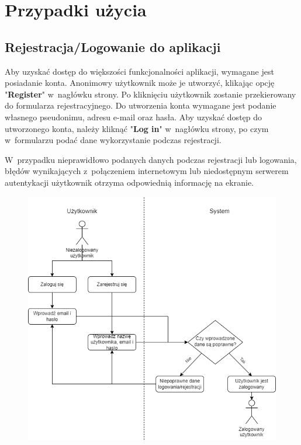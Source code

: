 \FloatBarrier

\section{Przypadki użycia}

\subsection{Rejestracja/Logowanie do aplikacji}

Aby uzyskać dostęp do większości funkcjonalności aplikacji, wymagane
jest posiadanie konta. Anonimowy użytkownik może je utworzyć, klikając
opcję "\textbf{Register}" w~nagłówku strony. Po kliknięciu użytkownik
zostanie przekierowany do formularza rejestracyjnego.
Do utworzenia konta wymagane jest podanie własnego
pseudonimu, adresu e-mail oraz hasła. Aby uzyskać dostęp do utworzonego
konta, należy kliknąć "\textbf{Log in}" w~nagłówku strony, po czym
w~formularzu podać dane wykorzystanie podczas rejestracji.

W~przypadku nieprawidłowo podanych danych podczas rejestracji
lub logowania, błędów wynikających z~połączeniem internetowym lub
niedostępnym serwerem autentykacji użytkownik otrzyma odpowiednią
informację na ekranie.

\begin{figure}[h]
  \centering
  \includegraphics[width=\textwidth]{img/schematy/login.png}
  \caption{}
\end{figure}

